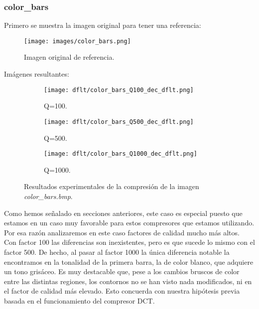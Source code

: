 \documentclass[12pt,a4paper]{article}
\begin{document}
\subsubsection{color\_bars}
Primero se muestra la imagen original para tener una referencia:
\begin{figure}[H]
    \centering
    \texttt{[image: images/color\_bars.png]}
    \caption[Referencia - color\_bars]{Imagen original de referencia.}
    
\end{figure}

\vspace{0.5cm}

Imágenes resultantes:
\begin{figure}   [H]
    \begin{subfigure}{0.30\textwidth}
        \centering
        \texttt{[image: dflt/color\_bars\_Q100\_dec\_dflt.png]}
        \caption{Q=100.}
        
    \end{subfigure}
    \hfill
    \begin{subfigure}{0.30\textwidth}
        \centering
        \texttt{[image: dflt/color\_bars\_Q500\_dec\_dflt.png]}
        \caption{Q=500.}
        
    \end{subfigure}
    \hfill
    \begin{subfigure}{0.30\textwidth}
        \centering
        \texttt{[image: dflt/color\_bars\_Q1000\_dec\_dflt.png]}
        \caption{Q=1000.}
        
    \end{subfigure}
    
    \caption[Resultados experimentales - color\_bars]{Resultados experimentales de la compresión de la imagen \textit{color\_bars.bmp}.}
    
\end{figure}

Como hemos señalado en secciones anteriores, este caso es especial puesto que estamos en un caso muy favorable para estos compresores que estamos utilizando. Por esa razón analizaremos en este caso factores de calidad mucho más altos.\\

Con factor 100 las diferencias son inexistentes, pero es que sucede lo mismo con el factor 500. De hecho, al pasar al factor 1000 la única diferencia notable la encontramos en la tonalidad de la primera barra, la de color blanco, que adquiere un tono grisáceo. Es muy destacable que, pese a los cambios bruscos de color entre las distintas regiones, los contornos no se han visto nada modificados, ni en el factor de calidad más elevado. Esto concuerda con nuestra hipótesis previa basada en el funcionamiento del compresor DCT.\\
\end{document}
